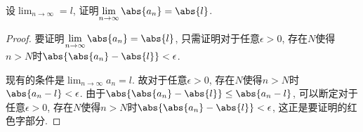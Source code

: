 \documentclass{ctexart}
\begin{document}
\begin{ex}
    设$\displaystyle \lim_{n\rightarrow \infty} = l$, 证明$\displaystyle \lim_{n\rightarrow \infty} \abs{a_n} = \abs{l}$.
\end{ex}
\begin{proof}
    要证明$\displaystyle \lim_{n\rightarrow \infty} \abs{a_n} = \abs{l}$, 只需证明{\color{red}对于任意$\epsilon>0$, 存在$N$使得$n>N$时$\displaystyle\abs{\abs{a_n} - \abs{l}} < \epsilon$}.
    \par
    现有的条件是$\displaystyle \lim_{n\rightarrow \infty} a_n = l$. 故对于任意$\epsilon>0$, 存在$N$使得$n>N$时$\displaystyle\abs{{a_n} - {l}} < \epsilon$. 由于$\abs{\abs{a_n} - \abs{l}} \le \abs{a_n - l}$, 可以断定对于任意$\epsilon>0$, 存在$N$使得$n>N$时$\displaystyle\abs{\abs{a_n} - \abs{l}} < \epsilon$, 这正是要证明的红色字部分.
\end{proof}
\end{document}
